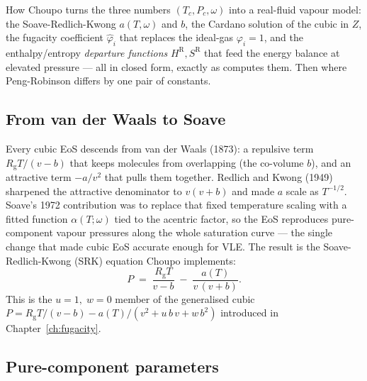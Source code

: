 \documentclass[11pt,a4paper]{article}
\newcommand{\Rgas}{R_{\!\mathrm{g}}}                %
\begin{document}
\begin{whatyoulllearn}
How Choupo turns the three numbers $(T_c, P_c, \omega)$ into a
real-fluid vapour model: the Soave-Redlich-Kwong $a(T,\omega)$ and
$b$, the Cardano solution of the cubic in $Z$, the fugacity
coefficient $\hat\varphi_i$ that replaces the ideal-gas $\varphi_i =
1$, and the enthalpy/entropy \emph{departure functions} $H^{\mathrm
R}, S^{\mathrm R}$ that feed the energy balance at elevated pressure
--- all in closed form, exactly as
 computes them.  Then where
Peng-Robinson differs by one pair of constants.
\end{whatyoulllearn}

\subsection{From van der Waals to Soave}

Every cubic EoS descends from van der Waals (1873): a repulsive term
$\Rgas T/(v-b)$ that keeps molecules from overlapping (the co-volume
$b$), and an attractive term $-a/v^2$ that pulls them together.
Redlich and Kwong (1949) sharpened the attractive denominator to
$v(v+b)$ and made $a$ scale as $T^{-1/2}$.  Soave's 1972 contribution
\cite{Soave1972} was to replace that fixed temperature scaling with a
fitted function $\alpha(T;\omega)$ tied to the acentric factor, so the
EoS reproduces pure-component vapour pressures along the whole
saturation curve --- the single change that made cubic EoS accurate
enough for VLE.  The result is the Soave-Redlich-Kwong (SRK)
equation Choupo implements:
\begin{equation}
   P \;=\; \frac{\Rgas T}{v - b} \;-\; \frac{a(T)}{v\,(v + b)}.
   \label{eq:srk-pv}
\end{equation}
This is the $u=1,\;w=0$ member of the generalised cubic
$P = \Rgas T/(v-b) - a(T)/(v^2 + u\,b\,v + w\,b^2)$ introduced in
Chapter~\ref{ch:fugacity}.

\subsection{Pure-component parameters}
\end{document}
